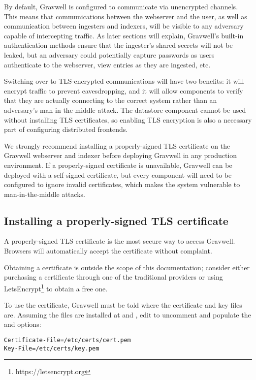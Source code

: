 By default, Gravwell is configured to communicate via unencrypted
channels. This means that communications between the webserver and the
user, as well as communication between ingesters and indexers, will be
visible to any adversary capable of intercepting traffic. As later
sections will explain, Gravwell's built-in authentication methods ensure
that the ingester's shared secrets will not be leaked, but an adversary
could potentially capture passwords as users authenticate to the
webserver, view entries as they are ingested, etc.

Switching over to TLS-encrypted communications will have two benefits:
it will encrypt traffic to prevent eavesdropping, and it will allow
components to verify that they are actually connecting to the correct
system rather than an adversary's man-in-the-middle attack. The
datastore component cannot be used without installing TLS certificates,
so enabling TLS encryption is also a necessary part of configuring
distributed frontends.

We strongly recommend installing a properly-signed TLS certificate on
the Gravwell webserver and indexer before deploying Gravwell in any
production environment. If a properly-signed certificate is unavailable,
Gravwell can be deployed with a self-signed certificate, but every
component will need to be configured to ignore invalid certificates,
which makes the system vulnerable to man-in-the-middle attacks.

\subsection{Installing a properly-signed TLS certificate}

A properly-signed TLS certificate is the most secure way to access
Gravwell. Browsers will automatically accept the certificate without
complaint.

Obtaining a certificate is outside the scope of this documentation;
consider either purchasing a certificate through one of the traditional
providers or
using LetsEncrypt\footnote{https://letsencrypt.org} to
obtain a free one.

To use the certificate, Gravwell must be told where the certificate and
key files are. Assuming the files are installed at  and
, edit  to uncomment and populate
the  and  options:

\begin{Verbatim}[breaklines=true]
Certificate-File=/etc/certs/cert.pem
Key-File=/etc/certs/key.pem
\end{Verbatim}

